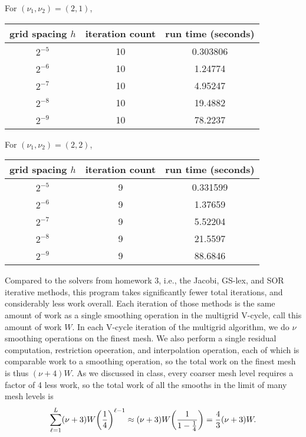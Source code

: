 \documentclass[12pt]{article}
\begin{document}
\noindent For $(\nu_1, \nu_2) = (2,1)$,  \\
\begin{center}
\begin{tabular}{||c|c|c||}
\hline \hline
   grid spacing $h$ &   iteration count &   run time (seconds) \\
\hline \hline
       $2^{-5}$   &                10 &             0.303806 \\
       $2^{-6}$   &                10 &             1.24774   \\
       $2^{-7}$  &                10 &             4.95247  \\
       $2^{-8}$ &                10 &            19.4882   \\
       $2^{-9}$ & 10 & 78.2237 \\
\hline \hline
\end{tabular}
\end{center}

\noindent For $(\nu_1, \nu_2) = (2,2)$,  \\
\begin{center}
\begin{tabular}{||c|c|c||}
\hline \hline
   grid spacing $h$ &   iteration count &   run time (seconds) \\
\hline \hline
       $2^{-5}$    &                 9 &             0.331599 \\
       $2^{-6}$   &                 9 &           1.37659  \\
       $2^{-7}$ &                 9 &             5.52204  \\
       $2^{-8}$ &                 9 &            21.5597   \\
       $2^{-9}$ & 9 & 88.6846 \\
\hline \hline
\end{tabular}
\end{center}

Compared to the solvers from homework 3, i.e., the Jacobi, GS-lex, and SOR iterative methods, this program takes significantly fewer total iterations, and considerably less work overall. Each iteration of those methods is the same amount of work as a single smoothing operation in the multigrid V-cycle, call this amount of work $W$.  In each V-cycle iteration of the multigrid algorithm, we do $\nu$ smoothing operations on the finest mesh. We also perform a single residual computation, restriction opeeration, and interpolation operation, each of which is comparable work to a smoothing operation, so the total work on the finest mesh is thus $(\nu + 4)W$. As we discussed in class, every coarser mesh level requires a factor of 4 less work, so the total work of all the smooths in the limit of many mesh levels is 
$$\sum_{\ell =1}^L (\nu + 3) W \qty(\dfrac{1}{4})^{\ell - 1} \approx (\nu+3)W\qty(\dfrac{1}{1-\frac{1}{4}}) = \dfrac{4}{3}(\nu+3)W.$$
\end{document}
